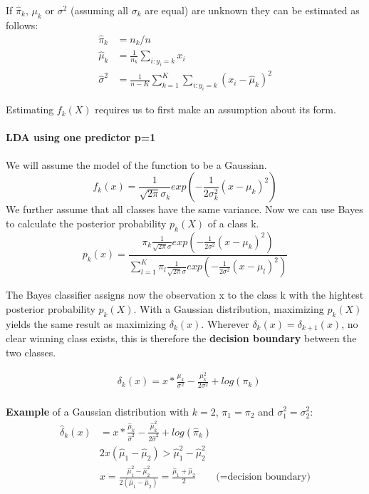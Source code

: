 \documentclass[../document.tex]{subfiles}
\begin{document}
	If $\hat{\pi}_k$, $\mu_k$ or $\sigma^2$ (assuming all $\sigma_k$ are equal) are unknown they can be estimated as follows:
	\begin{equation}
	\begin{split}
		\hat{\pi}_{k}&=n_{k}/n\\
		\hat{\mu}_{k}&=\frac{1}{n_{k}}\sum_{i:y_{i}=k}x_{i}\\
		\hat{\sigma}^2&=\frac{1}{n-K}\sum_{k=1}^{K}\sum_{i:y_{i}=k}(x_{i}-\hat{\mu}_{k})^2
	\end{split}
	\end{equation}

	Estimating \(f_{k}(X)\) requires us to first make an assumption about its form.

	\sectionbreak
	\paragraph{LDA using one predictor p=1}
	We will assume the model of the function to be a Gaussian.
	\begin{equation}
		f_{k}(x)=\frac{1}{\sqrt{2\pi}\sigma_{k}}exp(-\frac{1}{2\sigma_{k}^2}(x-\mu_{k})^2)
	\end{equation}
	We further assume that all classes have the same variance. Now we can use Bayes to calculate the posterior probability $p_{k}(X)$ of a class k.
	\begin{equation}
	p_{k}(x)=\frac{\pi_{k}\frac{1}{\sqrt{2\pi}\sigma}exp(-\frac{1}{2\sigma^2}(x-\mu_{k})^2)}{\sum_{l=1}^{K}\pi_{l}\frac{1}{\sqrt{2\pi}\sigma}exp(-\frac{1}{2\sigma^2}(x-\mu_{l})^2)}
	\end{equation}

	The Bayes classifier assigns now the observation x to the class k with the hightest posterior probability $p_{k}(X)$. With a Gaussian distribution, maximizing $p_{k}(X)$ yields the same result as maximizing $\delta_{k}(x)$. Wherever $\delta_{k}(x)=\delta_{k+1}(x)$, no clear winning class exists, this is therefore the \textbf{decision boundary} between the two classes.

	\begin{equation}
		\begin{split}
			&\delta_{k}(x)=x*\frac{\mu_{k}}{\sigma^2}-\frac{\mu_{k}^2}{2\sigma^2}+log(\pi_{k})\\
		\end{split}
	\end{equation}

	\textbf{Example} of a Gaussian distribution with $k=2$, $\pi_1=\pi_2$ and $\sigma^2_1=\sigma^2_2$:
	\begin{equation}
	\begin{split}
		\hat{\delta}_{k}(x)&=x*\frac{\hat{\mu}_{k}}{\hat{\sigma}^2}-\frac{\hat{\mu}_{k}^2}{2\hat{\sigma}^2}+log(\hat{\pi}_{k})\\
		&2x(\hat{\mu}_{1}-\hat{\mu}_{2})>\hat{\mu}_{1}^2-\hat{\mu}_{2}^2\\
		&x=\frac{\hat{\mu}_{1}^2-\hat{\mu}_{2}^2}{2(\hat{\mu}_{1}-\hat{\mu}_{2})}=\frac{\hat{\mu}_{1}+\hat{\mu}_{2}}{2} \qquad \text{(=decision boundary)}
	\end{split}
	\end{equation}
\end{document}

